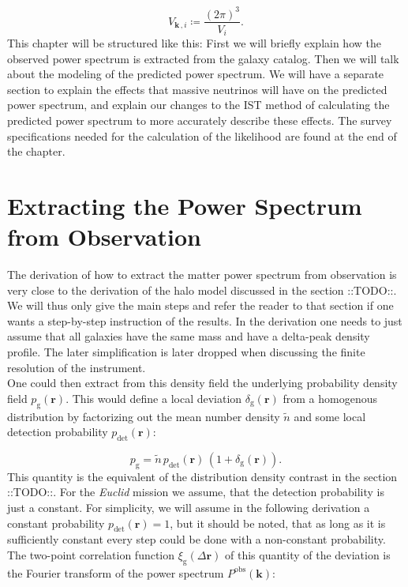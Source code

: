 \documentclass[oneside]{book}
\newcommand*{\Euclid}{\textit{Euclid}\xspace}
\newcommand*{\marktodo}{{\color{mmcol} ::TODO::}\xspace}
\begin{document}
\begin{equation*}
    \label{eq:lkl_spectro_v1}
    V_{\boldsymbol{k}\,,i} \coloneq \frac{(2\pi)^3}{V_{i}}.
\end{equation*}
This chapter will be structured like this: First we will briefly explain how the observed power spectrum is extracted from the galaxy catalog. Then we will talk about the modeling of the predicted power spectrum. We will have a separate section to explain the effects that massive neutrinos will have on the predicted power spectrum, and explain our changes to the IST method of calculating the predicted power spectrum to more accurately describe these effects. The survey specifications needed for the calculation of the likelihood are found at the end of the chapter.

\section{Extracting the Power Spectrum from Observation}
The derivation of how to extract the matter power spectrum from observation is very close to the derivation of the halo model discussed in the section \marktodo. We will thus only give the main steps and refer the reader to that section if one wants a step-by-step instruction of the results. In the derivation one needs to just assume that all galaxies have the same mass and have a delta-peak density profile. The later simplification is later dropped when discussing the finite resolution of the instrument.\\
One could then extract from this density field the underlying probability density field $p_\mathrm{g}(\boldsymbol{r})$. This would define a  local deviation $\delta_\mathrm{g}(\boldsymbol{r})$ from a homogenous distribution by factorizing out the mean number density $\tilde{n} $ and some local detection probability $p_\mathrm{det}(\boldsymbol{r})$: 

\begin{equation}
    p_\mathrm{g} = \tilde{n} \, p_\mathrm{det}(\boldsymbol{r}) \, \left( 1 + \delta_\mathrm{g}(\boldsymbol{r} )\right).
\end{equation}
This quantity is the equivalent of the distribution density contrast in the section \marktodo. For the \Euclid mission we assume, that the detection probability is just a constant. For simplicity, we will assume in the following derivation a constant probability $ p_\mathrm{det}(\boldsymbol{r})=1$, but it should be noted, that as long as it is sufficiently constant every step could be done with a non-constant probability.\\ 
The two-point correlation function $\xi_\mathrm{g}(\Delta\boldsymbol{r})$ of this quantity of the deviation is the Fourier transform of the power spectrum $P^\mathrm{obs}(\boldsymbol{k})$: 
\end{document}
